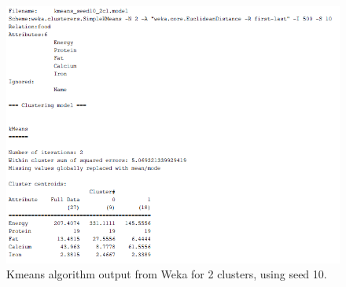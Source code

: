 \documentclass[letterpaper,12pt]{article}
\begin{document}
\begin{figure}[H] 
  \centering
      \includegraphics[width=0.5\columnwidth]{kmeans_seed10_2cl_output}

        \caption{
                \label{fig:kmeans_10_2_out}  
                Kmeans algorithm output from Weka for 2 clusters, using seed 10.
        }
\end{figure}
\end{document}

